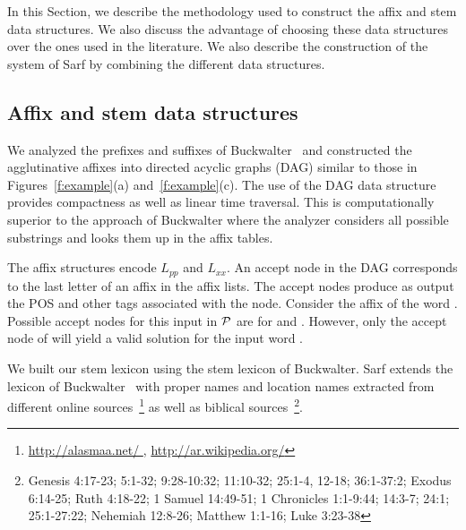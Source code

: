 In this Section, we describe the methodology used to construct the affix and stem data structures. 
We also discuss the advantage of choosing these data structures over the ones used in the literature. 
We also describe the construction of the system of Sarf by combining the different data structures.

\subsection{Affix and stem data structures}

We analyzed the prefixes and suffixes of 
Buckwalter~
and constructed the agglutinative affixes
into directed acyclic graphs (DAG) similar to 
those in Figures~\ref{f:example}(a) and~\ref{f:example}(c).
The use of the DAG data structure provides compactness as well as 
linear time traversal.
This is computationally superior to the 
approach of Buckwalter where the analyzer considers
all possible substrings and looks them up in the affix tables. 

The affix structures encode $L_{pp}$ and $L_{xx}$. 
An accept node in the DAG corresponds to the last letter 
of an affix in the affix lists. 
The accept nodes produce as output the POS and other tags
associated with the node. 
Consider the affix  of the word . 
Possible accept nodes for this input in ${\cal P}$ are for 
 and . 
However, only the accept node of  will yield a valid 
solution for the input word .


We built our stem lexicon using the stem lexicon of 
Buckwalter. 
Sarf extends the lexicon of Buckwalter~ with
proper names and location names extracted from different online 
sources~\footnote{\href{http://alasmaa.net/}{http://alasmaa.net/ }, 
\href{http://ar.wikipedia.org/}{http://ar.wikipedia.org/}}
as well as biblical sources~\footnote{Genesis 4:17-23; 5:1-32; 9:28-10:32; 11:10-32; 25:1-4, 12-18; 36:1-37:2; Exodus 6:14-25; Ruth 4:18-22; 1 Samuel 14:49-51; 1 Chronicles 1:1-9:44; 14:3-7; 24:1; 25:1-27:22; Nehemiah 12:8-26; Matthew 1:1-16; Luke 3:23-38}.

